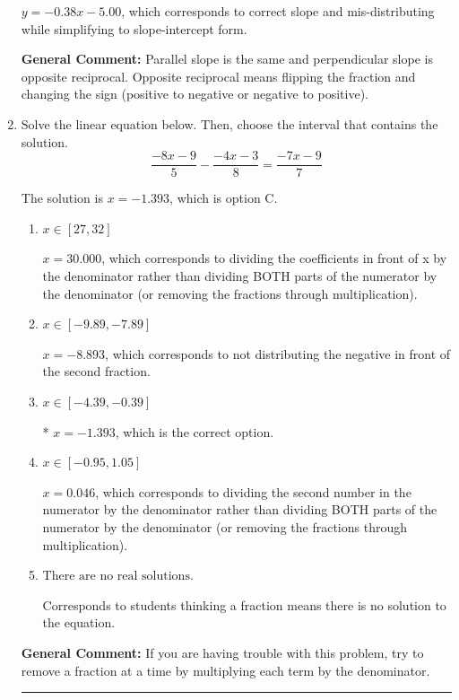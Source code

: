 \documentclass{extbook}[14pt]
\newcommand{\litem}[1]{\item #1

\rule{\textwidth}{0.4pt}}
\begin{document}
\begin{enumerate}
{\begin{enumerate}[label=\Alph*.]
 $y = -0.38x - 5.00$, which corresponds to correct slope and mis-distributing while simplifying to slope-intercept form.
\end{enumerate}

\textbf{General Comment:} Parallel slope is the same and perpendicular slope is opposite reciprocal. Opposite reciprocal means flipping the fraction and changing the sign (positive to negative or negative to positive).
}
\litem{
Solve the linear equation below. Then, choose the interval that contains the solution.
\[ \frac{-8x -9}{5} - \frac{-4x -3}{8} = \frac{-7x -9}{7} \]

The solution is \( x = -1.393 \), which is option C.\begin{enumerate}[label=\Alph*.]
\item \( x \in [27, 32] \)

 $x = 30.000$, which corresponds to dividing the coefficients in front of x by the denominator rather than dividing BOTH parts of the numerator by the denominator (or removing the fractions through multiplication).
\item \( x \in [-9.89, -7.89] \)

 $x = -8.893$, which corresponds to not distributing the negative in front of the second fraction.
\item \( x \in [-4.39, -0.39] \)

* $x = -1.393$, which is the correct option.
\item \( x \in [-0.95, 1.05] \)

 $x = 0.046$, which corresponds to dividing the second number in the numerator by the denominator rather than dividing BOTH parts of the numerator by the denominator (or removing the fractions through multiplication).
\item \( \text{There are no real solutions.} \)

Corresponds to students thinking a fraction means there is no solution to the equation.
\end{enumerate}

\textbf{General Comment:} If you are having trouble with this problem, try to remove a fraction at a time by multiplying each term by the denominator.
}
\end{enumerate}
\end{document}
